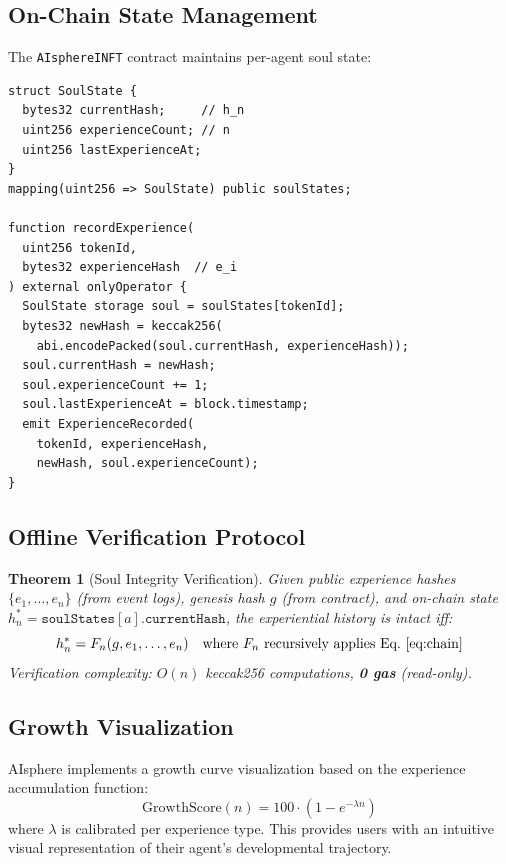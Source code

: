 \documentclass[10pt,a4paper]{article}
\theoremstyle{definition}
\theoremstyle{plain}
\newtheorem{theorem}{Theorem}[section]
\begin{document}
\subsection{On-Chain State Management}

The \texttt{AIsphereINFT} contract maintains per-agent soul state:

\begin{lstlisting}[caption={Soul hash chain advancement (Solidity).}]
struct SoulState {
  bytes32 currentHash;     // h_n
  uint256 experienceCount; // n
  uint256 lastExperienceAt;
}
mapping(uint256 => SoulState) public soulStates;

function recordExperience(
  uint256 tokenId,
  bytes32 experienceHash  // e_i
) external onlyOperator {
  SoulState storage soul = soulStates[tokenId];
  bytes32 newHash = keccak256(
    abi.encodePacked(soul.currentHash, experienceHash));
  soul.currentHash = newHash;
  soul.experienceCount += 1;
  soul.lastExperienceAt = block.timestamp;
  emit ExperienceRecorded(
    tokenId, experienceHash,
    newHash, soul.experienceCount);
}
\end{lstlisting}

\subsection{Offline Verification Protocol}

\begin{theorem}[Soul Integrity Verification]\label{thm:verify}
Given public experience hashes $\{e_1, \ldots, e_n\}$ (from event logs), genesis hash $g$ (from contract), and on-chain state $h^*_n = \texttt{soulStates}[a].\texttt{currentHash}$, the experiential history is intact iff:
$$h^*_n = F_n(g, e_1, \ldots, e_n) \quad \text{where } F_n \text{ recursively applies Eq.~\eqref{eq:chain}}$$
Verification complexity: $O(n)$ keccak256 computations, \textbf{0 gas} (read-only).
\end{theorem}

\subsection{Growth Visualization}

AIsphere implements a growth curve visualization based on the experience accumulation function:
$$\text{GrowthScore}(n) = 100 \cdot \left(1 - e^{-\lambda n}\right)$$
where $\lambda$ is calibrated per experience type. This provides users with an intuitive visual representation of their agent's developmental trajectory.
\end{document}
